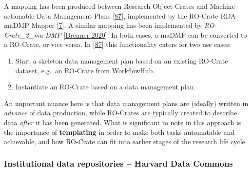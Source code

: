 A mapping has been produced between Research Object Crates and
Machine-actionable Data Management Plans
{[}\href{https://doi.org/10.4126/frl01-006423291}{87}{]}, implemented by
the RO-Crate RDA maDMP Mapper
{[}\href{https://doi.org/10.5281/zenodo.3922136}{7}{]}. A similar
mapping has been implemented by \emph{RO-Crate\_2\_ma-DMP}
{[}\href{https://doi.org/10.5281/zenodo.3903463}{Brenner 2020}{]}. In both cases,
a maDMP can be converted to a RO-Crate, or vice versa. In
{[}\href{https://doi.org/10.4126/frl01-006423291}{87}{]} this
functionality caters for two use cases:

\begin{enumerate}
\def\labelenumi{\arabic{enumi}.}
\tightlist
\item
  Start a skeleton data management plan based on an existing RO-Crate
  dataset, e.g.~an RO-Crate from WorkflowHub.
\item
  Instantiate an RO-Crate based on a data management plan.
\end{enumerate}

An important nuance here is that data management plans are (ideally)
written in \emph{advance} of data production, while RO-Crates are
typically created to describe data \emph{after} it has been generated.
What is significant to note in this approach is the importance of
\textbf{templating} in order to make both tasks automatable and
achievable, and how RO-Crate can fit into earlier stages of the research
life cycle.

\hypertarget{institutionalrepos}{%
\subsubsection{Institutional data repositories -- Harvard Data
Commons}\label{institutionalrepos}}

